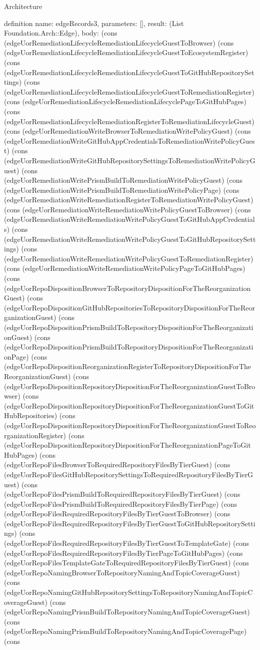 \begin{lexlean}{Architecture}
\begin{semanticmodule}
definition{
  name: edgeRecords3,
  parameters: [],
  result: (List Foundation.Arch::Edge),
  body: (cons (edgeUorRemediationLifecycleRemediationLifecycleGuestToBrowser) (cons (edgeUorRemediationLifecycleRemediationLifecycleGuestToEcosystemRegister) (cons (edgeUorRemediationLifecycleRemediationLifecycleGuestToGitHubRepositorySettings) (cons (edgeUorRemediationLifecycleRemediationLifecycleGuestToRemediationRegister) (cons (edgeUorRemediationLifecycleRemediationLifecyclePageToGitHubPages) (cons (edgeUorRemediationLifecycleRemediationRegisterToRemediationLifecycleGuest) (cons (edgeUorRemediationWriteBrowserToRemediationWritePolicyGuest) (cons (edgeUorRemediationWriteGitHubAppCredentialsToRemediationWritePolicyGuest) (cons (edgeUorRemediationWriteGitHubRepositorySettingsToRemediationWritePolicyGuest) (cons (edgeUorRemediationWritePrismBuildToRemediationWritePolicyGuest) (cons (edgeUorRemediationWritePrismBuildToRemediationWritePolicyPage) (cons (edgeUorRemediationWriteRemediationRegisterToRemediationWritePolicyGuest) (cons (edgeUorRemediationWriteRemediationWritePolicyGuestToBrowser) (cons (edgeUorRemediationWriteRemediationWritePolicyGuestToGitHubAppCredentials) (cons (edgeUorRemediationWriteRemediationWritePolicyGuestToGitHubRepositorySettings) (cons (edgeUorRemediationWriteRemediationWritePolicyGuestToRemediationRegister) (cons (edgeUorRemediationWriteRemediationWritePolicyPageToGitHubPages) (cons (edgeUorRepoDispositionBrowserToRepositoryDispositionForTheReorganizationGuest) (cons (edgeUorRepoDispositionGitHubRepositoriesToRepositoryDispositionForTheReorganizationGuest) (cons (edgeUorRepoDispositionPrismBuildToRepositoryDispositionForTheReorganizationGuest) (cons (edgeUorRepoDispositionPrismBuildToRepositoryDispositionForTheReorganizationPage) (cons (edgeUorRepoDispositionReorganizationRegisterToRepositoryDispositionForTheReorganizationGuest) (cons (edgeUorRepoDispositionRepositoryDispositionForTheReorganizationGuestToBrowser) (cons (edgeUorRepoDispositionRepositoryDispositionForTheReorganizationGuestToGitHubRepositories) (cons (edgeUorRepoDispositionRepositoryDispositionForTheReorganizationGuestToReorganizationRegister) (cons (edgeUorRepoDispositionRepositoryDispositionForTheReorganizationPageToGitHubPages) (cons (edgeUorRepoFilesBrowserToRequiredRepositoryFilesByTierGuest) (cons (edgeUorRepoFilesGitHubRepositorySettingsToRequiredRepositoryFilesByTierGuest) (cons (edgeUorRepoFilesPrismBuildToRequiredRepositoryFilesByTierGuest) (cons (edgeUorRepoFilesPrismBuildToRequiredRepositoryFilesByTierPage) (cons (edgeUorRepoFilesRequiredRepositoryFilesByTierGuestToBrowser) (cons (edgeUorRepoFilesRequiredRepositoryFilesByTierGuestToGitHubRepositorySettings) (cons (edgeUorRepoFilesRequiredRepositoryFilesByTierGuestToTemplateGate) (cons (edgeUorRepoFilesRequiredRepositoryFilesByTierPageToGitHubPages) (cons (edgeUorRepoFilesTemplateGateToRequiredRepositoryFilesByTierGuest) (cons (edgeUorRepoNamingBrowserToRepositoryNamingAndTopicCoverageGuest) (cons (edgeUorRepoNamingGitHubRepositorySettingsToRepositoryNamingAndTopicCoverageGuest) (cons (edgeUorRepoNamingPrismBuildToRepositoryNamingAndTopicCoverageGuest) (cons (edgeUorRepoNamingPrismBuildToRepositoryNamingAndTopicCoveragePage) (cons }
\end{semanticmodule}
\end{lexlean}
